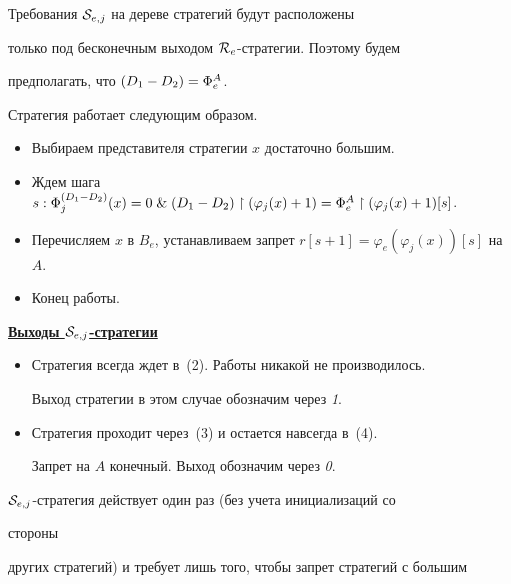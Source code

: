 \noindent Требования ${\cal S}_{e,j}$ на дереве стратегий будут расположены


только под бесконечным выходом ${\cal R}_e$-стратегии. Поэтому будем


предполагать, что $\draz=\Phi_e^A$.





Стратегия работает следующим образом.


\begin{itemize}


\item[(1)] Выбираем представителя стратегии $x$ достаточно большим.


\item[(2)] Ждем шага $s:\Phi_j^{\draz}(x)=0\;\&\;\draz\rst(\varphi_j(x)+1)=


\Phi_e^A \rst(\varphi_j(x)+1) [s]$.


\item[(3)] Перечисляем $x$ в $B_e$, устанавливаем запрет $r[s+1]=


\varphi_e(\varphi_j(x)) [s]$ на~$A$.


\item[(4)] Конец работы.


\end{itemize}


 


\underline{\bf Выходы ${\cal S}_{e,j}$-стратегии}





\begin{itemize}


\item[1)] Стратегия всегда ждет в~(2). Работы никакой не производилось.


Выход стратегии в этом случае обозначим через {\it 1}.


\item[2)] Стратегия проходит через~(3) и остается навсегда в~(4).


Запрет на $A$ конечный. Выход обозначим через {\it 0}.


\end{itemize}


${\cal S}_{e,j}$-стратегия действует один раз (без учета инициализаций со


стороны


других стратегий) и требует лишь того, чтобы запрет стратегий с большим


